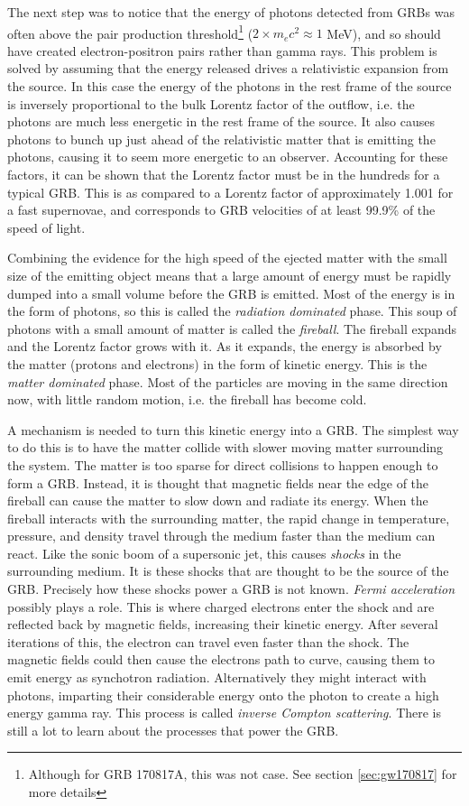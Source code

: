 \documentclass[11pt]{cuthesis}
\begin{document}
The next step was to notice that the energy of photons detected from GRBs was often above the pair production threshold\footnote{Although for GRB 170817A, this was not case. See section \ref{sec:gw170817} for more details} ($2\times m_e c^2\approx 1$ MeV), and so should have created electron-positron pairs rather than gamma rays. This problem is solved by assuming that the energy released drives a relativistic expansion from the source. In this case the energy of the photons in the rest frame of the source is inversely proportional to the bulk Lorentz factor of the outflow, i.e. the photons are much less energetic in the rest frame of the source. It also causes photons to bunch up just ahead of the relativistic matter that is emitting the photons, causing it to seem more energetic to an observer. Accounting for these factors, it can be shown that the Lorentz factor must be in the hundreds for a typical GRB. This is as compared to a Lorentz factor of approximately 1.001 for a fast supernovae, and corresponds to GRB velocities of at least 99.9\% of the speed of light. 

Combining the evidence for the high speed of the ejected matter with the small size of the emitting object means that a large amount of energy must be rapidly dumped into a small volume before the GRB is emitted. Most of the energy is in the form of photons, so this is called the \textit{radiation dominated} phase. This soup of photons with a small amount of matter is called the \textit{fireball}. The fireball expands and the Lorentz factor grows with it. As it expands, the energy is absorbed by the matter (protons and electrons) in the form of kinetic energy. This is the \textit{matter dominated} phase. Most of the particles are moving in the same direction now, with little random motion, i.e. the fireball has become cold. 

A mechanism is needed to turn this kinetic energy into a GRB. The simplest way to do this is to have the matter collide with slower moving matter surrounding the system. The matter is too sparse for direct collisions to happen enough to form a GRB. Instead, it is thought that magnetic fields near the edge of the fireball can cause the matter to slow down and radiate its energy. When the fireball interacts with the surrounding matter, the rapid change in temperature, pressure, and density travel through the medium faster than the medium can react. Like the sonic boom of a supersonic jet, this causes \textit{shocks} in the surrounding medium. It is these shocks that are thought to be the source of the GRB. Precisely how these shocks power a GRB is not known. \textit{Fermi acceleration} possibly plays a role. This is where charged electrons enter the shock and are reflected back by magnetic fields, increasing their kinetic energy. After several iterations of this, the electron can travel even faster than the shock. The magnetic fields could then cause the electrons path to curve, causing them to emit energy as synchotron radiation. Alternatively they might interact with photons, imparting their considerable energy onto the photon to create a high energy gamma ray. This process is called \textit{inverse Compton scattering}. There is still a lot to learn about the processes that power the GRB.
\end{document}
